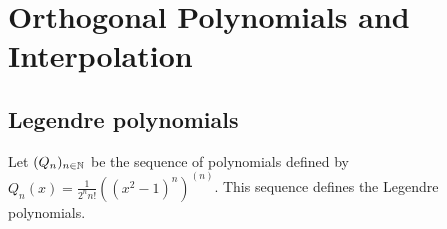 \renewcommand{\chaptername}{Assignment}
\chapter{Orthogonal Polynomials and Interpolation}

\section{Legendre polynomials}
Let \((Q_n)_{n\in\mathbb{N}}\) be the sequence of polynomials defined by \(Q_n(x) = \frac{1}{2^n n!} \left((x^2-1)^n\right)^{(n)} \).
This sequence defines the Legendre polynomials.
